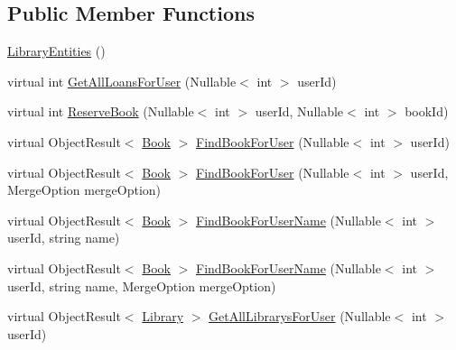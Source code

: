 \subsection*{Public Member Functions}
\begin{DoxyCompactItemize}
\item 
\mbox{\hyperlink{class_easy_library_application_1_1_w_p_f_1_1_model_1_1_library_entities_a81e1cd94e4cbabfbbaf51d0ad6452acb}{Library\+Entities}} ()
\item 
virtual int \mbox{\hyperlink{class_easy_library_application_1_1_w_p_f_1_1_model_1_1_library_entities_af44eeece49e0c500e1e4abdc85890391}{Get\+All\+Loans\+For\+User}} (Nullable$<$ int $>$ user\+Id)
\item 
virtual int \mbox{\hyperlink{class_easy_library_application_1_1_w_p_f_1_1_model_1_1_library_entities_aae5c26f7831e616efbc4db78eb03ccd5}{Reserve\+Book}} (Nullable$<$ int $>$ user\+Id, Nullable$<$ int $>$ book\+Id)
\item 
virtual Object\+Result$<$ \mbox{\hyperlink{class_easy_library_application_1_1_w_p_f_1_1_model_1_1_book}{Book}} $>$ \mbox{\hyperlink{class_easy_library_application_1_1_w_p_f_1_1_model_1_1_library_entities_a58f40b3e21c1e305fec3b87a5598c0a8}{Find\+Book\+For\+User}} (Nullable$<$ int $>$ user\+Id)
\item 
virtual Object\+Result$<$ \mbox{\hyperlink{class_easy_library_application_1_1_w_p_f_1_1_model_1_1_book}{Book}} $>$ \mbox{\hyperlink{class_easy_library_application_1_1_w_p_f_1_1_model_1_1_library_entities_a94989c68d5b8d9875adf94a8a7edaf73}{Find\+Book\+For\+User}} (Nullable$<$ int $>$ user\+Id, Merge\+Option merge\+Option)
\item 
virtual Object\+Result$<$ \mbox{\hyperlink{class_easy_library_application_1_1_w_p_f_1_1_model_1_1_book}{Book}} $>$ \mbox{\hyperlink{class_easy_library_application_1_1_w_p_f_1_1_model_1_1_library_entities_a8be8cef2265c0c037199fabdbd8ad9ba}{Find\+Book\+For\+User\+Name}} (Nullable$<$ int $>$ user\+Id, string name)
\item 
virtual Object\+Result$<$ \mbox{\hyperlink{class_easy_library_application_1_1_w_p_f_1_1_model_1_1_book}{Book}} $>$ \mbox{\hyperlink{class_easy_library_application_1_1_w_p_f_1_1_model_1_1_library_entities_af628a359412c0a46d9430586422963e7}{Find\+Book\+For\+User\+Name}} (Nullable$<$ int $>$ user\+Id, string name, Merge\+Option merge\+Option)
\item 
virtual Object\+Result$<$ \mbox{\hyperlink{class_easy_library_application_1_1_w_p_f_1_1_model_1_1_library}{Library}} $>$ \mbox{\hyperlink{class_easy_library_application_1_1_w_p_f_1_1_model_1_1_library_entities_ad7f09de90250a4549e1e9a00fb8b5d20}{Get\+All\+Librarys\+For\+User}} (Nullable$<$ int $>$ user\+Id)

\end{DoxyCompactItemize}
